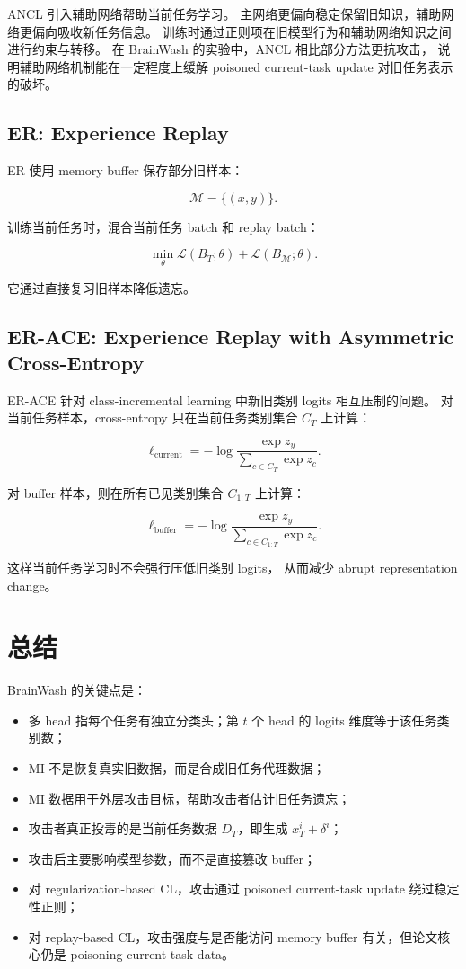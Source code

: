 \documentclass[11pt]{article}
\begin{document}
ANCL 引入辅助网络帮助当前任务学习。
主网络更偏向稳定保留旧知识，辅助网络更偏向吸收新任务信息。
训练时通过正则项在旧模型行为和辅助网络知识之间进行约束与转移。
在 BrainWash 的实验中，ANCL 相比部分方法更抗攻击，
说明辅助网络机制能在一定程度上缓解 poisoned current-task update 对旧任务表示的破坏。

\subsection{ER: Experience Replay}

ER 使用 memory buffer 保存部分旧样本：

\[
\mathcal{M}
=
\{(x,y)\}.
\]

训练当前任务时，混合当前任务 batch 和 replay batch：

\[
\min_{\theta}
\mathcal{L}(B_T;\theta)
+
\mathcal{L}(B_{\mathcal{M}};\theta).
\]

它通过直接复习旧样本降低遗忘。

\subsection{ER-ACE: Experience Replay with Asymmetric Cross-Entropy}

ER-ACE 针对 class-incremental learning 中新旧类别 logits 相互压制的问题。
对当前任务样本，cross-entropy 只在当前任务类别集合 \(C_T\) 上计算：

\[
\ell_{\mathrm{current}}
=
-
\log
\frac{\exp z_y}
{\sum_{c\in C_T}\exp z_c}.
\]

对 buffer 样本，则在所有已见类别集合 \(C_{1:T}\) 上计算：

\[
\ell_{\mathrm{buffer}}
=
-
\log
\frac{\exp z_y}
{\sum_{c\in C_{1:T}}\exp z_c}.
\]

这样当前任务学习时不会强行压低旧类别 logits，
从而减少 abrupt representation change。

\section{总结}

BrainWash 的关键点是：

\begin{itemize}
  \item 多 head 指每个任务有独立分类头；第 \(t\) 个 head 的 logits 维度等于该任务类别数；
  \item MI 不是恢复真实旧数据，而是合成旧任务代理数据；
  \item MI 数据用于外层攻击目标，帮助攻击者估计旧任务遗忘；
  \item 攻击者真正投毒的是当前任务数据 \(D_T\)，即生成 \(x_T^i+\delta^i\)；
  \item 攻击后主要影响模型参数，而不是直接篡改 buffer；
  \item 对 regularization-based CL，攻击通过 poisoned current-task update 绕过稳定性正则；
  \item 对 replay-based CL，攻击强度与是否能访问 memory buffer 有关，但论文核心仍是 poisoning current-task data。
\end{itemize}
\end{document}
